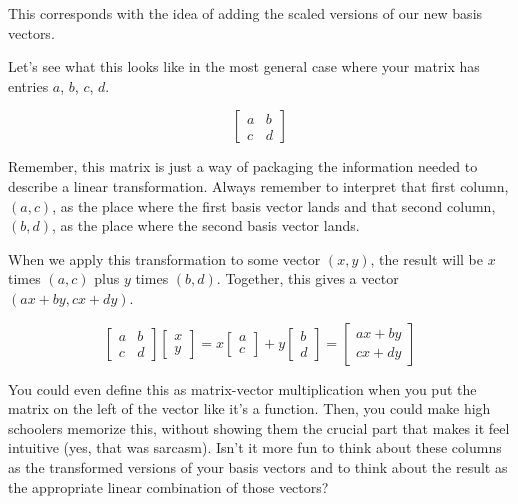 This corresponds with the idea of adding the scaled versions of our new basis
vectors.

Let's see what this looks like in the most general case where your matrix has
entries $a$, $b$, $c$, $d$.

\begin{equation*}
  \begin{bmatrix}
    a & b \\
    c & d
  \end{bmatrix}
\end{equation*}

Remember, this matrix is just a way of packaging the information needed to
describe a linear transformation. Always remember to interpret that first
column, $(a, c)$, as the place where the first basis vector lands and that
second column, $(b, d)$, as the place where the second basis vector lands.

When we apply this transformation to some vector $(x, y)$, the result will be
$x$ times $(a, c)$ plus $y$ times $(b, d)$. Together, this gives a vector
$(ax + by, cx + dy)$.

\begin{equation*}
  \begin{bmatrix}
    a & b \\
    c & d
  \end{bmatrix} \begin{bmatrix}
    x \\
    y
  \end{bmatrix} = x\begin{bmatrix}
    a \\
    c
  \end{bmatrix} + y\begin{bmatrix}
    b \\
    d
  \end{bmatrix} = \begin{bmatrix}
    ax + by \\
    cx + dy
  \end{bmatrix}
\end{equation*}

You could even define this as matrix-vector multiplication when you put the
matrix on the left of the vector like it's a function. Then, you could make high
schoolers memorize this, without showing them the crucial part that makes it
feel intuitive (yes, that was sarcasm). Isn't it more fun to think about these
columns as the transformed versions of your basis vectors and to think about the
result as the appropriate linear combination of those vectors?

